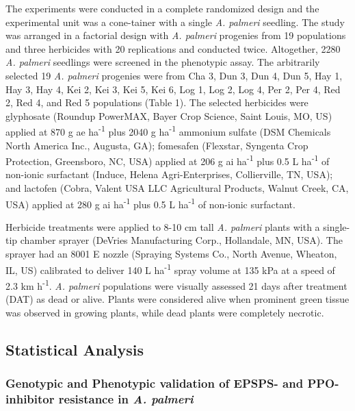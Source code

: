 \documentclass[
  12pt,
  a4paper]{article}
\begin{document}
The experiments were conducted in a complete randomized design and the
experimental unit was a cone-tainer with a single \emph{A. palmeri}
seedling. The study was arranged in a factorial design with \emph{A.
palmeri} progenies from 19 populations and three herbicides with 20
replications and conducted twice. Altogether, 2280 \emph{A. palmeri}
seedlings were screened in the phenotypic assay. The arbitrarily
selected 19 \emph{A. palmeri} progenies were from Cha 3, Dun 3, Dun 4,
Dun 5, Hay 1, Hay 3, Hay 4, Kei 2, Kei 3, Kei 5, Kei 6, Log 1, Log 2,
Log 4, Per 2, Per 4, Red 2, Red 4, and Red 5 populations (Table 1). The
selected herbicides were glyphosate (Roundup
PowerMAX\textsuperscript \textregistered, Bayer Crop Science, Saint
Louis, MO, US) applied at 870 g ae ha\textsuperscript{-1} plus 2040 g
ha\textsuperscript{-1} ammonium sulfate (DSM Chemicals North America
Inc., Augusta, GA); fomesafen (Flexstar\textsuperscript \textregistered,
Syngenta Crop Protection, Greensboro, NC, USA) applied at 206 g ai
ha\textsuperscript{-1} plus 0.5 L ha\textsuperscript{-1} of non-ionic
surfactant (Induce\textsuperscript \textregistered, Helena
Agri-Enterprises, Collierville, TN, USA); and lactofen
(Cobra\textsuperscript \textregistered, Valent USA LLC Agricultural
Products, Walnut Creek, CA, USA) applied at 280 g ai
ha\textsuperscript{-1} plus 0.5 L ha\textsuperscript{-1} of non-ionic
surfactant.

Herbicide treatments were applied to 8-10 cm tall \emph{A. palmeri}
plants with a single-tip chamber sprayer (DeVries Manufacturing Corp.,
Hollandale, MN, USA). The sprayer had an 8001 E nozzle (Spraying Systems
Co., North Avenue, Wheaton, IL, US) calibrated to deliver 140 L
ha\textsuperscript{-1} spray volume at 135 kPa at a speed of 2.3 km
h\textsuperscript{-1}. \emph{A. palmeri} populations were visually
assessed 21 days after treatment (DAT) as dead or alive. Plants were
considered alive when prominent green tissue was observed in growing
plants, while dead plants were completely necrotic.

\hypertarget{statistical-analysis}{%
\subsection{Statistical Analysis}\label{statistical-analysis}}

\hypertarget{genotypic-and-phenotypic-validation-of-epsps--and-ppo-inhibitor-resistance-in-a.-palmeri}{%
\subsubsection{\texorpdfstring{Genotypic and Phenotypic validation of
EPSPS- and PPO-inhibitor resistance in \emph{A.
palmeri}}{Genotypic and Phenotypic validation of EPSPS- and PPO-inhibitor resistance in A. palmeri}}\label{genotypic-and-phenotypic-validation-of-epsps--and-ppo-inhibitor-resistance-in-a.-palmeri}}
\end{document}
